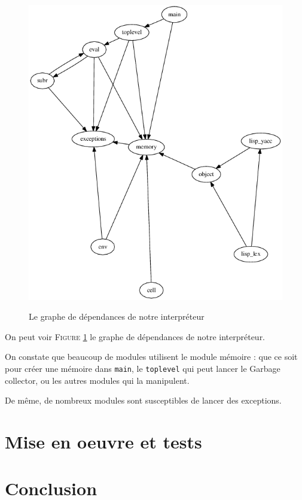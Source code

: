 \documentclass[12pt]{article}
\def\code #1{\lstinline{#1}}
\begin{document}
\begin{figure}
  \begin{center}
    \includegraphics[scale=0.4]{graph.png}
    \label{fig:dep}
    \caption{Le graphe de dépendances de notre interpréteur}
  \end{center}
\end{figure}


On peut voir \textsc{Figure} \ref{fig:dep} le graphe de dépendances de notre interpréteur.

On constate que beaucoup de modules utilisent le module mémoire : que ce soit pour créer une mémoire dans \code{main}, le \code{toplevel} qui peut lancer le Garbage collector, ou les autres modules qui la manipulent.

De même, de nombreux modules sont susceptibles de lancer des exceptions.

\section{Mise en oeuvre et tests}

\section{Conclusion}
\end{document}
